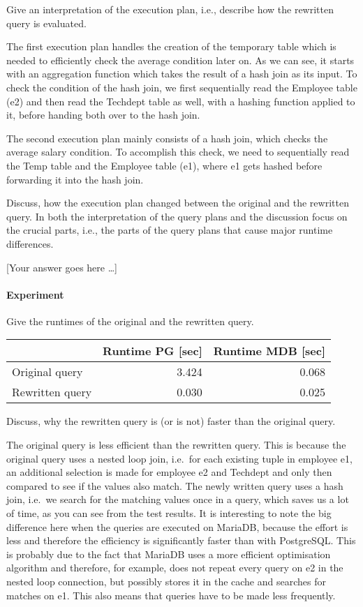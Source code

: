 \documentclass[11pt]{scrartcl}
\newcommand{\youranswerhere}{[Your answer goes here \ldots]}
\begin{document}
    Give an interpretation of the execution plan, i.e., describe how the rewritten query is evaluated.

    The first execution plan handles the creation of the temporary table which is needed to efficiently check the
    average condition later on.
    As we can see, it starts with an aggregation function which takes the result of a hash join as its input.
    To check the condition of the hash join, we first sequentially read the Employee table (e2) and then read the
    Techdept table as well, with a hashing function applied to it, before handing both over to the hash join.

    The second execution plan mainly consists of a hash join, which checks the average salary condition.
    To accomplish this check, we need to sequentially read the Temp table and the Employee table (e1), where e1 gets hashed
    before forwarding it into the hash join.


    Discuss, how the execution plan changed between the original and the rewritten query.
    In both the interpretation of the query plans and the discussion focus on the crucial parts, i.e., the parts of the
    query plans that cause major runtime differences.

    \youranswerhere{}

    \paragraph{Experiment}

    Give the runtimes of the original and the rewritten query.

    \begin{table}[H]
        \centering
        \begin{tabular}{l|r|r}
            & Runtime PG [sec] & Runtime MDB [sec] \tabularnewline
            \hline
            Original query & 3.424 & 0.068 \tabularnewline
            Rewritten query & 0.030 & 0.025 \tabularnewline
        \end{tabular}
    \end{table}

    Discuss, why the rewritten query is (or is not) faster than the original query.

    The original query is less efficient than the rewritten query.
    This is because the original query uses a nested loop join, i.e.\ for each existing tuple in employee e1, an additional selection is made for employee e2 and Techdept and only then compared to see if the values also match.
    The newly written query uses a hash join, i.e.\ we search for the matching values once in a query, which saves us a lot of time, as you can see from the test results. \newline
    It is interesting to note the big difference here when the queries are executed on MariaDB, because the effort is less and therefore the efficiency is significantly faster than with PostgreSQL\@.
    This is probably due to the fact that MariaDB uses a more efficient optimisation algorithm and therefore, for example, does not repeat every query on e2 in the nested loop connection, but possibly stores it in the cache and searches for matches on e1.
    This also means that queries have to be made less frequently.
\end{document}
